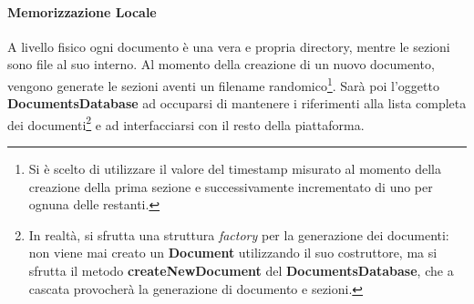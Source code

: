 \paragraph{Memorizzazione Locale}
A livello fisico ogni documento è una vera e propria directory, mentre le sezioni sono file al suo interno. Al momento della creazione di un nuovo documento, vengono generate le sezioni aventi un filename randomico\footnote{Si è scelto di utilizzare il valore del timestamp misurato al momento della creazione della prima sezione e successivamente incrementato di uno per ognuna delle restanti.}. Sarà poi l'oggetto \textbf{DocumentsDatabase} ad occuparsi di mantenere i riferimenti alla lista completa dei documenti\footnote{In realtà, si sfrutta una struttura \textit{factory} per la generazione dei documenti: non viene mai creato un \textbf{Document} utilizzando il suo costruttore, ma si sfrutta il metodo \textbf{createNewDocument} del \textbf{DocumentsDatabase}, che a cascata provocherà la generazione di documento e sezioni.} e ad interfacciarsi con il resto della piattaforma.